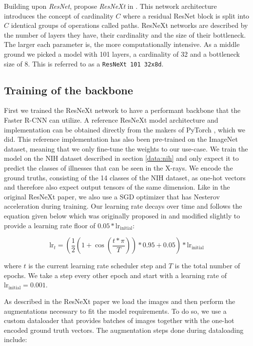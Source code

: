Building upon \textit{ResNet}, \citeauthor{xie_aggregated_2017} propose \textit{ResNeXt} in \autocite{xie_aggregated_2017}. This network architecture introduces the concept of cardinality $C$ where a residual ResNet block is split into $C$ identical groups of operations called paths. ResNeXt networks are described by the number of layers they have, their cardinality and the size of their bottleneck. The larger each parameter is, the more computationally intensive. As a middle ground we picked a model with 101 layers, a cardinality of 32 and a bottleneck size of 8. This is referred to as a \texttt{ResNeXt 101 32x8d}.

\subsection*{Training of the backbone}

First we trained the ResNeXt network to have a performant backbone that the Faster \ac{R-CNN} can utilize. A reference ResNeXt model architecture and implementation can be obtained directly from the makers of PyTorch \autocite{pytorch_team_resnext_nodate}, which we did. This reference implementation has also been pre-trained on the ImageNet dataset, meaning that we only fine-tune the weights to our use-case. We train the model on the NIH dataset described in section \vref{data:nih} and only expect it to predict the classes of illnesses that can be seen in the X-rays. We encode the ground truths, consisting of the 14 classes of the NIH dataset, as one-hot vectors and therefore also expect output tensors of the same dimension. Like in the original ResNeXt paper, we also use a \acf{SGD} optimizer that has Nesterov acceleration during training. Our learning rate decays over time and follows the equation given below which was originally proposed in \autocite{he_bag_2018} and modified slightly to provide a learning rate floor of $0.05 * \text{lr}_\text{initial}$: 

$$
\text{lr}_t = \left(\frac{1}{2}\left(1 + \cos\left(\frac{t * \pi}{T}\right)\right) * 0.95 + 0.05\right) * \text{lr}_\text{initial}
$$

where $t$ is the current learning rate scheduler step and $T$ is the total number of epochs. We take a step every other epoch and start with a learning rate of $\text{lr}_\text{initial} = 0.001$.

As described in the ResNeXt paper we load the images and then perform the augmentations necessary to fit the model requirements. To do so, we use a custom dataloader that provides batches of images together with the one-hot encoded ground truth vectors. The augmentation steps done during dataloading include:

